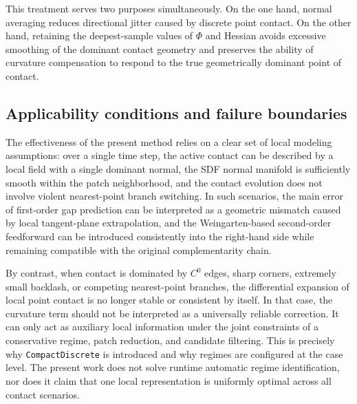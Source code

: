 This treatment serves two purposes simultaneously. On the one hand, normal averaging reduces directional jitter caused by discrete point contact. On the other hand, retaining the deepest-sample values of $\Phi$ and Hessian avoids excessive smoothing of the dominant contact geometry and preserves the ability of curvature compensation to respond to the true geometrically dominant point of contact.

\subsection{Applicability conditions and failure boundaries}
The effectiveness of the present method relies on a clear set of local modeling assumptions: over a single time step, the active contact can be described by a local field with a single dominant normal, the SDF normal manifold is sufficiently smooth within the patch neighborhood, and the contact evolution does not involve violent nearest-point branch switching. In such scenarios, the main error of first-order gap prediction can be interpreted as a geometric mismatch caused by local tangent-plane extrapolation, and the Weingarten-based second-order feedforward can be introduced consistently into the right-hand side while remaining compatible with the original complementarity chain.

By contrast, when contact is dominated by $C^0$ edges, sharp corners, extremely small backlash, or competing nearest-point branches, the differential expansion of local point contact is no longer stable or consistent by itself. In that case, the curvature term should not be interpreted as a universally reliable correction. It can only act as auxiliary local information under the joint constraints of a conservative regime, patch reduction, and candidate filtering. This is precisely why \texttt{CompactDiscrete} is introduced and why regimes are configured at the case level. The present work does not solve runtime automatic regime identification, nor does it claim that one local representation is uniformly optimal across all contact scenarios.
